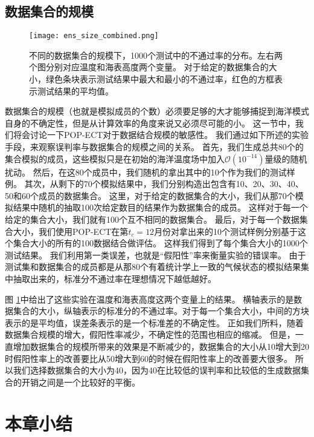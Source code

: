 \subsection{数据集合的规模} \label{verify:ens}

\begin{figure} 
\centering
\texttt{[image: ens\_size\_combined.png]}
\caption{ 不同的数据集合的规模下，1000个测试中的不通过率的分布。左右两个图分别对应温度和海表高度两个变量。
对于给定的数据集合的大小，绿色条块表示测试结果中最大和最小的不通过率，红色的方框表示测试结果的平均值。}
\label{fig:temp_ens_80}
\end {figure}
数据集合的规模（也就是模拟成员的个数）必须要足够的大才能够捕捉到海洋模式自身的不确定性，但是从计算效率的角度来说又必须尽可能的小。
这一节中，我们将会讨论一下POP-ECT对于数据结合规模的敏感性。
我们通过如下所述的实验手段，来观察误判率与数据集合的规模之间的关系。 
首先，我们生成总共80个的集合模拟的成员，这些模拟只是在初始的海洋温度场中加入$\mathcal{O}(10^{-14})$量级的随机扰动。 
然后，在这80个成员中，我们随机的拿出其中的10个作为我们的测试样例。 
其次，从剩下的70个模拟结果中，我们分别构造出包含有10、20、30、40、50和60个成员的数据集合。 
这里，对于给定的数据集合的大小，我们从那70个模拟结果中随机的抽取100次给定数目的结果作为数据集合的成员。
这样对于每一个给定的集合大小，我们就有100个互不相同的数据集合。 
最后，对于每一个数据集合大小，我们使用POP-ECT在第$t_c = 12$月份对拿出来的10个测试样例分别基于这个集合大小的所有的100数据结合做评估。
这样我们得到了每个集合大小的1000个测试结果。
我们利用第一类误差，也就是“假阳性”率来衡量实验的错误率。 
由于测试集和数据集合的成员都是从那80个有着统计学上一致的气候状态的模拟结果集中抽取出来的，标准分不通过率在理想情况下越低越好。 

图 \ref{fig:temp_ens_80}中给出了这些实验在温度和海表高度这两个变量上的结果。 
横轴表示的是数据集合的大小，纵轴表示的标准分的不通过率。对于每一个集合大小，中间的方块表示的是平均值，误差条表示的是一个标准差的不确定性。
正如我们所料，随着数据集合规模的增大，假阳性率减少，不确定性的范围也相应的缩减。 
但是，一直增加数据集合的规模所带来的效果是不断减少的，数据集合的大小从10增大到20时假阳性率上的改善要比从50增大到60的时候在假阳性率上的改善要大很多。 
所以我们选择数据集合的大小为40，因为40在比较低的误判率和比较低的生成数据集合的开销之间是一个比较好的平衡。 
 

\section{本章小结}
\label{verify:Conclusion}

